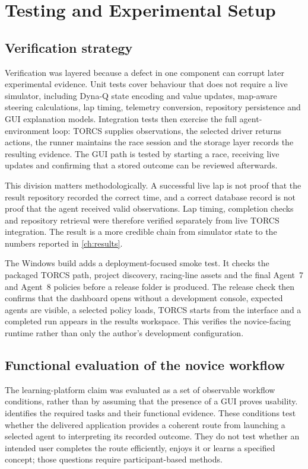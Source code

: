 \section{Testing and Experimental Setup}
\label{ch:testing}

\subsection{Verification strategy}

Verification was layered because a defect in one component can corrupt later experimental evidence. Unit tests cover behaviour that does not require a live simulator, including Dyna-Q state encoding and value updates, map-aware steering calculations, lap timing, telemetry conversion, repository persistence and GUI explanation models. Integration tests then exercise the full agent-environment loop: TORCS supplies observations, the selected driver returns actions, the runner maintains the race session and the storage layer records the resulting evidence. The GUI path is tested by starting a race, receiving live updates and confirming that a stored outcome can be reviewed afterwards.

This division matters methodologically. A successful live lap is not proof that the result repository recorded the correct time, and a correct database record is not proof that the agent received valid observations. Lap timing, completion checks and repository retrieval were therefore verified separately from live TORCS integration. The result is a more credible chain from simulator state to the numbers reported in \cref{ch:results}.

The Windows build adds a deployment-focused smoke test. It checks the packaged TORCS path, project discovery, racing-line assets and the final Agent~7 and Agent~8 policies before a release folder is produced. The release check then confirms that the dashboard opens without a development console, expected agents are visible, a selected policy loads, TORCS starts from the interface and a completed run appears in the results workspace. This verifies the novice-facing runtime rather than only the author's development configuration.

\subsection{Functional evaluation of the novice workflow}

The learning-platform claim was evaluated as a set of observable workflow conditions, rather than by assuming that the presence of a GUI proves usability.  identifies the required tasks and their functional evidence. These conditions test whether the delivered application provides a coherent route from launching a selected agent to interpreting its recorded outcome. They do not test whether an intended user completes the route efficiently, enjoys it or learns a specified concept; those questions require participant-based methods.

